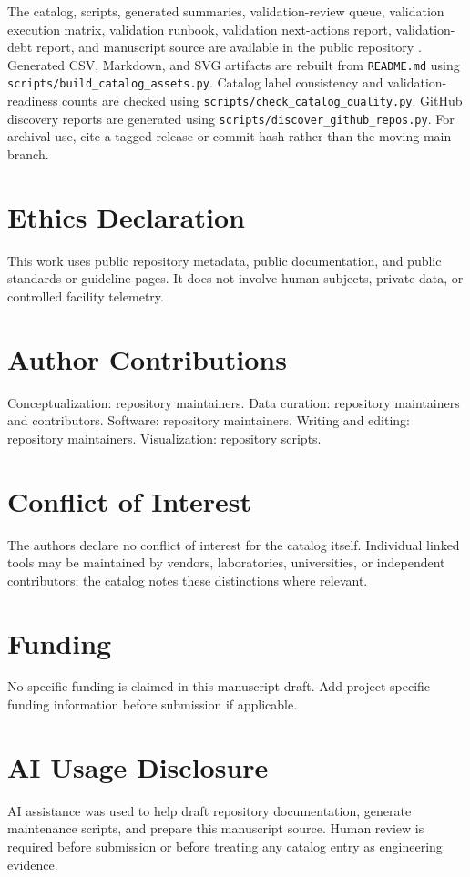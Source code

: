 \documentclass[11pt]{article}
\begin{document}
The catalog, scripts, generated summaries, validation-review queue, validation execution matrix, validation runbook, validation next-actions report, validation-debt report, and manuscript source are available in the public repository \cite{DCCRT2026}. Generated CSV, Markdown, and SVG artifacts are rebuilt from \texttt{README.md} using \texttt{scripts/build\_catalog\_assets.py}. Catalog label consistency and validation-readiness counts are checked using \texttt{scripts/check\_catalog\_quality.py}. GitHub discovery reports are generated using \texttt{scripts/discover\_github\_repos.py}. For archival use, cite a tagged release or commit hash rather than the moving main branch.

\section*{Ethics Declaration}

This work uses public repository metadata, public documentation, and public standards or guideline pages. It does not involve human subjects, private data, or controlled facility telemetry.

\section*{Author Contributions}

Conceptualization: repository maintainers. Data curation: repository maintainers and contributors. Software: repository maintainers. Writing and editing: repository maintainers. Visualization: repository scripts.

\section*{Conflict of Interest}

The authors declare no conflict of interest for the catalog itself. Individual linked tools may be maintained by vendors, laboratories, universities, or independent contributors; the catalog notes these distinctions where relevant.

\section*{Funding}

No specific funding is claimed in this manuscript draft. Add project-specific funding information before submission if applicable.

\section*{AI Usage Disclosure}

AI assistance was used to help draft repository documentation, generate maintenance scripts, and prepare this manuscript source. Human review is required before submission or before treating any catalog entry as engineering evidence.



\end{document}
